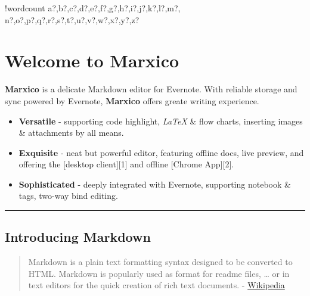 \documentclass{article}
\providecommand{\tightlist}{%
  \setlength{\itemsep}{0pt}\setlength{\parskip}{0pt}}
\newcounter{words}
\newenvironment{counted}{%
  \setcounter{words}{0}
  \SearchList!{wordcount}{\stepcounter{words}}
    {a?,b?,c?,d?,e?,f?,g?,h?,i?,j?,k?,l?,m?,
    n?,o?,p?,q?,r?,s?,t?,u?,v?,w?,x?,y?,z?}
  \UndoBoundary{'}
  \SearchOrder{p;}}{%
  \StopSearching}
\begin{document}
\begin{abstract}
\end{abstract}
\tableofcontents
\newpage
\begin{counted} %
\section{Welcome to Marxico}\label{welcome-to-marxico}

\textbf{Marxico} is a delicate Markdown editor for Evernote. With
reliable storage and sync powered by Evernote, \textbf{Marxico} offers
greate writing experience.

\begin{itemize}
\tightlist
\item
  \textbf{Versatile} - supporting code highlight, \emph{LaTeX} \& flow
  charts, inserting images \& attachments by all means.
\item
  \textbf{Exquisite} - neat but powerful editor, featuring offline docs,
  live preview, and offering the {[}desktop client{]}{[}1{]} and offline
  {[}Chrome App{]}{[}2{]}.
\item
  \textbf{Sophisticated} - deeply integrated with Evernote, supporting
  notebook \& tags, two-way bind editing.
\end{itemize}

\begin{center}\rule{0.5\linewidth}{\linethickness}\end{center}

\subsection{Introducing Markdown}\label{introducing-markdown}

\begin{quote}
Markdown is a plain text formatting syntax designed to be converted to
HTML. Markdown is popularly used as format for readme files, \ldots{} or
in text editors for the quick creation of rich text documents. -
\href{http://en.wikipedia.org/wiki/Markdown}{Wikipedia}
\end{quote}


\end{counted}
\end{document}
